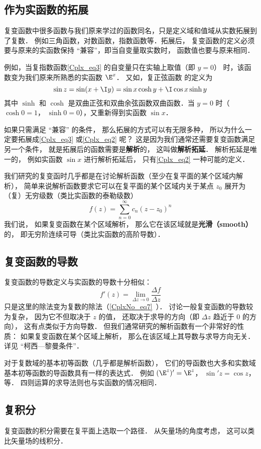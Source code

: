 \subsection{作为实函数的拓展}
复变函数中很多函数与我们原来学过的函数同名，只是定义域和值域从实数拓展到了复数． 例如三角函数，对数函数，指数函数等．拓展后， 复变函数的定义必须要与原来的实函数保持 “兼容”，即当自变量取实数时， 函数值也要与原来相同．

例如，当复指数函数\autoref{Cplx_eq3} 的自变量只在实轴上取值（即 $y = 0$） 时，该函数变为我们原来所熟悉的实函数 $\E^x$．  又如，复正弦函数 的定义为
\begin{equation}\label{Cplx_eq2}
\sin z = \sin(x + \I y) = \sin x\cosh y + \I\cos x\sinh y
\end{equation}
其中 $\sinh $ 和 $\cosh $ 是双曲正弦和双曲余弦函数双曲函数．当 $y = 0$ 时（$\cosh 0 = 1$， $\sinh 0 = 0$），又重新得到实函数 $\sin x$．

如果只需满足 “兼容” 的条件， 那么拓展的方式可以有无限多种， 所以为什么一定要拓展成\autoref{Cplx_eq3} 或\autoref{Cplx_eq2} 呢？ 这是因为我们通常还需要复变函数满足另一个条件， 就是拓展后的函数需要是\textbf{解析}的， 这叫做\textbf{解析拓延}． %
解析拓延是唯一的， 例如实函数 $\sin x$ 进行解析拓延后， 只有\autoref{Cplx_eq2} 一种可能的定义．

我们研究的复变函时几乎都是在讨论解析函数（至少在复平面的某个区域内解析）， 简单来说解析函数要求它可以在复平面的某个区域内关于某点 $z_0$ 展开为（复）无穷级数（类比实函数的泰勒级数）
\begin{equation}
f(z) = \sum_{n=0}^\infty c_n (z - z_0)^n
\end{equation}
我们说， 如果复变函数在某个区域解析， 那么它在该区域就是\textbf{光滑（smooth）}的， 即无穷阶连续可导（类比实函数的高阶导数）．

\subsection{复变函数的导数}
复变函数的导数定义与实函数的导数十分相似：
\begin{equation}
f'(z) = \lim_{\Delta z \to 0} \frac{\Delta f}{\Delta z}
\end{equation}
只是这里的除法变为复数的除法（\autoref{CplxNo_eq7}~）． 讨论一般复变函数的导数较为复杂， 因为它不但取决于 $z$ 的值， 还取决于求导的方向（即 $\Delta z$ 趋近于 $0$ 的方向）， 这有点类似于方向导数． 但我们通常研究的解析函数有一个非常好的性质： 如果复变函数在某个区域上解析， 那么在该区域上其导数与求导方向无关． 详见 “柯西—黎曼条件”．

对于复数域的基本初等函数（几乎都是解析函数）， 它们的导函数也大多和实数域基本初等函数的导函数具有一样的表达式． 例如 $(\E^z)' = \E^z$， $\sin' z = \cos z$， 等． 四则运算的求导法则也与实函数的情况相同．

\subsection{复积分}
复变函数的积分需要在复平面上选取一个路径． 从矢量场的角度考虑， 这可以类比矢量场的线积分．
